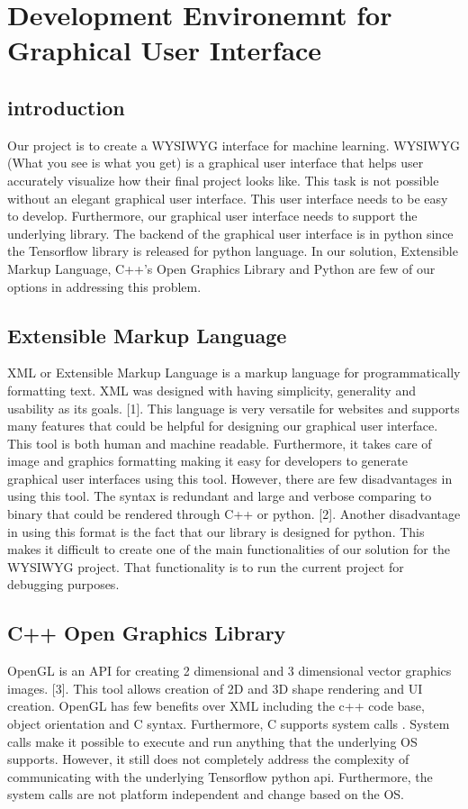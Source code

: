 \documentclass[journal,10pt,onecolumn,compsoc]{IEEEtran} \usepackage[margin=1.0in]{geometry} \usepackage{pdfpages} \usepackage{graphicx}
\begin{document}
\section{Development Environemnt for Graphical User Interface}
\subsection{introduction}
Our project is to create a WYSIWYG interface for machine learning. 
WYSIWYG (What you see is what you get) is a graphical user interface that helps user accurately visualize how their final project looks like. 
This task is not possible without an elegant graphical user interface. 
This user interface needs to be easy to develop. 
Furthermore, our graphical user interface needs to support the underlying library. 
The backend of the graphical user interface is in python since the Tensorflow library is released for python language. 
In our solution, Extensible Markup Language, C++’s Open Graphics Library and Python are few of our options in addressing this problem.

\subsection{Extensible Markup Language}
XML or Extensible Markup Language is a markup language for programmatically formatting text. 
XML was designed with having simplicity, generality and usability as its goals. [1]. 
This language is very versatile for websites and supports many features that could be helpful for designing our graphical user interface. 
This tool is both human and machine readable. 
Furthermore, it takes care of image and graphics formatting making it easy for developers to generate graphical user interfaces using this tool. 
However, there are few disadvantages in using this tool. 
The syntax is redundant and large and verbose comparing to binary that could be rendered through C++ or python. [2]. 
Another disadvantage in using this format  is the fact that our library is designed for python. 
This makes it difficult to create one of the main functionalities of our solution for the WYSIWYG project. 
That functionality is to run the current project for debugging purposes.

\subsection{C++ Open Graphics Library}
OpenGL is an API for creating 2 dimensional and 3 dimensional vector graphics images. [3]. 
This tool allows creation of 2D and 3D shape rendering and UI creation. 
OpenGL has few benefits over XML including the c++ code base, object orientation and C syntax. 
Furthermore, C supports system calls . 
System calls make it possible to execute and run anything that the underlying OS supports. 
However, it still does not completely address the complexity of communicating with the underlying Tensorflow python api. 
Furthermore, the system calls are not platform independent and change based on the OS.
\end{document}
